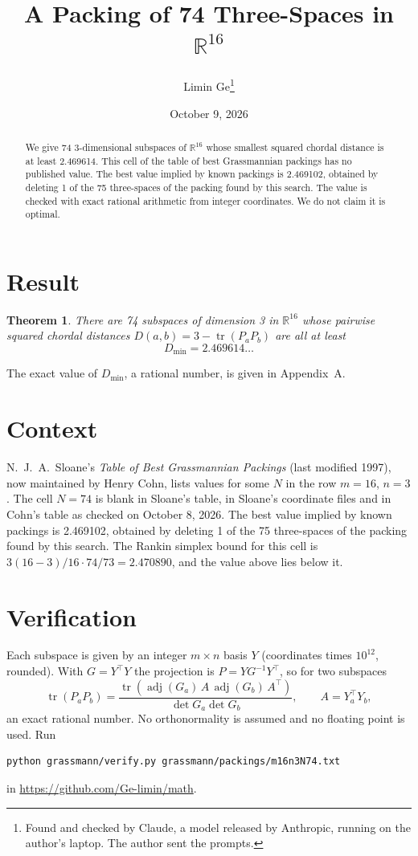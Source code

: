 \documentclass[11pt,a4paper]{article}
\title{A Packing of 74 Three-Spaces in $\mathbb{R}^{16}$}
\author{Limin Ge\thanks{Found and checked by Claude, a model released by Anthropic, running on the author's laptop. The author sent the prompts.}}
\date{October 9, 2026}
\newtheorem*{theorem}{Theorem}
\begin{document}
\maketitle
\begin{abstract}
We give 74 3-dimensional subspaces of $\mathbb{R}^{16}$ whose smallest squared chordal distance is at least 2.469614. This cell of the table of best Grassmannian packings has no published value. The best value implied by known packings is 2.469102, obtained by deleting 1 of the 75 three-spaces of the packing found by this search. The value is checked with exact rational arithmetic from integer coordinates. We do not claim it is optimal.
\end{abstract}

\section{Result}
\begin{theorem}
There are 74 subspaces of dimension 3 in $\mathbb{R}^{16}$ whose pairwise squared chordal distances $D(a,b) = 3 - \operatorname{tr}(P_aP_b)$ are all at least
\[ D_{\min} = 2.469614\ldots \]
\end{theorem}
The exact value of $D_{\min}$, a rational number, is given in Appendix~A.


\section{Context}
N.~J.~A.~Sloane's \emph{Table of Best Grassmannian Packings} (last modified 1997), now maintained by Henry Cohn, lists values for some $N$ in the row $m=16$, $n=3$. The cell $N=74$ is blank in Sloane's table, in Sloane's coordinate files and in Cohn's table as checked on October 8, 2026. The best value implied by known packings is 2.469102, obtained by deleting 1 of the 75 three-spaces of the packing found by this search. The Rankin simplex bound for this cell is $3(16-3)/16\cdot 74/73 = 2.470890$, and the value above lies below it.


\section{Verification}
Each subspace is given by an integer $m\times n$ basis $Y$ (coordinates times $10^{12}$, rounded). With $G=Y^\top Y$ the projection is $P=YG^{-1}Y^\top$, so for two subspaces
\[ \operatorname{tr}(P_aP_b)=\frac{\operatorname{tr}(\operatorname{adj}(G_a)\,A\,\operatorname{adj}(G_b)\,A^\top)}{\det G_a\det G_b},\qquad A=Y_a^\top Y_b, \]
an exact rational number. No orthonormality is assumed and no floating point is used. Run
\begin{verbatim}
python grassmann/verify.py grassmann/packings/m16n3N74.txt
\end{verbatim}
in \url{https://github.com/Ge-limin/math}.
\end{document}

